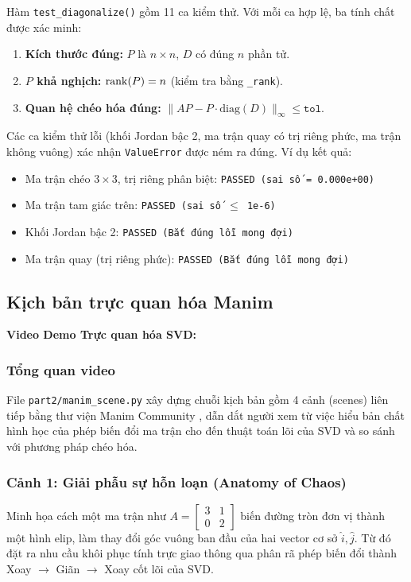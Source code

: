 Hàm \texttt{test\_diagonalize()} gồm 11 ca kiểm thử. Với mỗi ca hợp lệ, ba tính chất được xác minh:

\begin{enumerate}
    \item \textbf{Kích thước đúng:} $P$ là $n \times n$, $D$ có đúng $n$ phần tử.
    \item \textbf{$P$ khả nghịch:} $\operatorname{rank}(P) = n$ (kiểm tra bằng \texttt{\_rank}).
    \item \textbf{Quan hệ chéo hóa đúng:} $\|AP - P \cdot \text{diag}(D)\|_\infty \leq \texttt{tol}$.
\end{enumerate}

Các ca kiểm thử lỗi (khối Jordan bậc 2, ma trận quay có trị riêng phức, ma trận không vuông) xác nhận \texttt{ValueError} được ném ra đúng. Ví dụ kết quả:

\begin{itemize}
    \item Ma trận chéo $3 \times 3$, trị riêng phân biệt: \texttt{PASSED (sai số = 0.000e+00)}
    \item Ma trận tam giác trên: \texttt{PASSED (sai số $\leq$ 1e{-6})}
    \item Khối Jordan bậc 2: \texttt{PASSED (Bắt đúng lỗi mong đợi)}
    \item Ma trận quay (trị riêng phức): \texttt{PASSED (Bắt đúng lỗi mong đợi)}
\end{itemize}


\subsection{Kịch bản trực quan hóa Manim}

\textbf{Video Demo Trực quan hóa SVD:} \url{}

\subsubsection{Tổng quan video}

File \texttt{part2/manim\_scene.py} xây dựng chuỗi kịch bản gồm 4 cảnh (scenes) liên tiếp bằng thư viện Manim Community \cite{manim_docs}, dẫn dắt người xem từ việc hiểu bản chất hình học của phép biến đổi ma trận cho đến thuật toán lõi của SVD và so sánh với phương pháp chéo hóa. 

\subsubsection{Cảnh 1: Giải phẫu sự hỗn loạn (Anatomy of Chaos)}
Minh họa cách một ma trận như $A = \begin{bmatrix} 3 & 1 \\ 0 & 2 \end{bmatrix}$ biến đường tròn đơn vị thành một hình elip, làm thay đổi góc vuông ban đầu của hai vector cơ sở $\hat{i}, \hat{j}$. Từ đó đặt ra nhu cầu khôi phục tính trực giao thông qua phân rã phép biến đổi thành Xoay $\rightarrow$ Giãn $\rightarrow$ Xoay cốt lõi của SVD.

